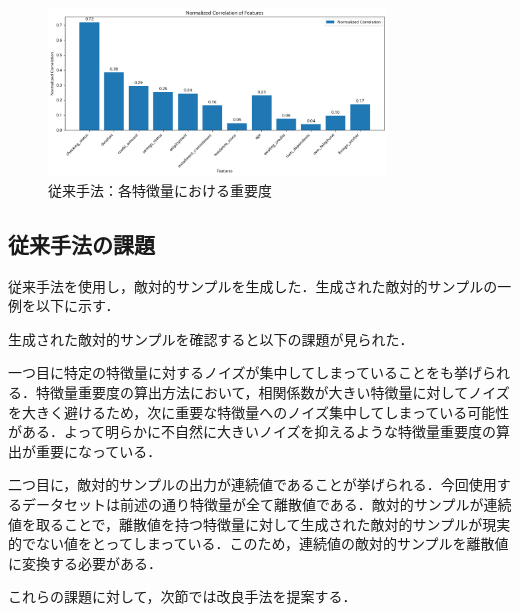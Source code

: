 \begin{figure}[H]
    \centering
    \includegraphics[width=0.8\textwidth]{images/従来手法_特徴量重要度.png}
    \caption{従来手法：各特徴量における重要度}
    \label{fig:default_method_feature_importance}
\end{figure}


\subsection{従来手法の課題}
従来手法を使用し，敵対的サンプルを生成した．生成された敵対的サンプルの一例を以下に示す．


生成された敵対的サンプルを確認すると以下の課題が見られた．

一つ目に特定の特徴量に対するノイズが集中してしまっていることをも挙げられる．特徴量重要度の算出方法において，相関係数が大きい特徴量に対してノイズを大きく避けるため，次に重要な特徴量へのノイズ集中してしまっている可能性がある．よって明らかに不自然に大きいノイズを抑えるような特徴量重要度の算出が重要になっている．
    

二つ目に，敵対的サンプルの出力が連続値であることが挙げられる．今回使用するデータセットは前述の通り特徴量が全て離散値である．敵対的サンプルが連続値を取ることで，離散値を持つ特徴量に対して生成された敵対的サンプルが現実的でない値をとってしまっている．このため，連続値の敵対的サンプルを離散値に変換する必要がある．


これらの課題に対して，次節では改良手法を提案する．